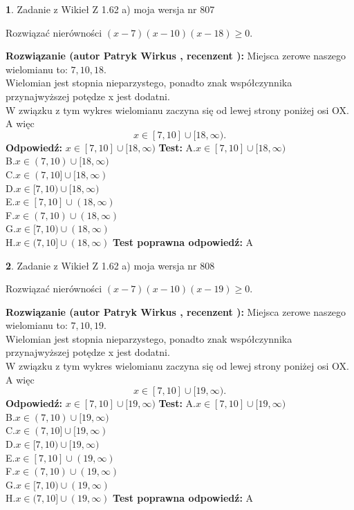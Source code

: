 \documentclass[12pt, a4paper]{article}
\theoremstyle{definition} %
\newtheorem{zad}{}
\newcommand{\zadStart}[1]{\begin{zad}#1\newline}
\newcommand{\zadStop}{\end{zad}}
\newcommand{\rozwStart}[2]{\noindent \textbf{Rozwiązanie (autor #1 , recenzent #2): }\newline}
\newcommand{\rozwStop}{\newline}
\newcommand{\odpStart}{\noindent \textbf{Odpowiedź:}\newline}
\newcommand{\odpStop}{\newline}
\newcommand{\testStart}{\noindent \textbf{Test:}\newline}
\newcommand{\testStop}{\newline}
\newcommand{\kluczStart}{\noindent \textbf{Test poprawna odpowiedź:}\newline}
\newcommand{\kluczStop}{\newline}
\begin{document}
\zadStart{Zadanie z Wikieł Z 1.62 a) moja wersja nr 807}

Rozwiązać nierówności $(x-7)(x-10)(x-18)\ge0$.
\zadStop
\rozwStart{Patryk Wirkus}{}
Miejsca zerowe naszego wielomianu to: $7, 10, 18$.\\
Wielomian jest stopnia nieparzystego, ponadto znak współczynnika przy\linebreak najwyższej potędze x jest dodatni.\\ W związku z tym wykres wielomianu zaczyna się od lewej strony poniżej osi OX. A więc $$x \in [7,10] \cup [18,\infty).$$
\rozwStop
\odpStart
$x \in [7,10] \cup [18,\infty)$
\odpStop
\testStart
A.$x \in [7,10] \cup [18,\infty)$\\
B.$x \in (7,10) \cup [18,\infty)$\\
C.$x \in (7,10] \cup [18,\infty)$\\
D.$x \in [7,10) \cup [18,\infty)$\\
E.$x \in [7,10] \cup (18,\infty)$\\
F.$x \in (7,10) \cup (18,\infty)$\\
G.$x \in [7,10) \cup (18,\infty)$\\
H.$x \in (7,10] \cup (18,\infty)$
\testStop
\kluczStart
A
\kluczStop



\zadStart{Zadanie z Wikieł Z 1.62 a) moja wersja nr 808}

Rozwiązać nierówności $(x-7)(x-10)(x-19)\ge0$.
\zadStop
\rozwStart{Patryk Wirkus}{}
Miejsca zerowe naszego wielomianu to: $7, 10, 19$.\\
Wielomian jest stopnia nieparzystego, ponadto znak współczynnika przy\linebreak najwyższej potędze x jest dodatni.\\ W związku z tym wykres wielomianu zaczyna się od lewej strony poniżej osi OX. A więc $$x \in [7,10] \cup [19,\infty).$$
\rozwStop
\odpStart
$x \in [7,10] \cup [19,\infty)$
\odpStop
\testStart
A.$x \in [7,10] \cup [19,\infty)$\\
B.$x \in (7,10) \cup [19,\infty)$\\
C.$x \in (7,10] \cup [19,\infty)$\\
D.$x \in [7,10) \cup [19,\infty)$\\
E.$x \in [7,10] \cup (19,\infty)$\\
F.$x \in (7,10) \cup (19,\infty)$\\
G.$x \in [7,10) \cup (19,\infty)$\\
H.$x \in (7,10] \cup (19,\infty)$
\testStop
\kluczStart
A
\kluczStop
\end{document}
